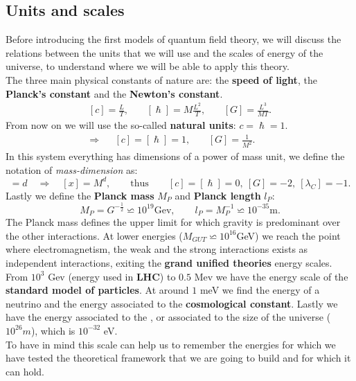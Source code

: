 \subsection{Units and scales}
Before introducing the first models of quantum field theory, we will discuss the relations between the units that we will use and the scales of energy of the universe, to understand where we will be able to apply this theory.\\
The three main physical constants of nature are: the \textbf{speed of light}, the \textbf{Planck's constant} and the \textbf{Newton's constant}.
\begin{align*}
    &&[c]=\frac{L}{T},\ &&[\hslash]=M\frac{L^2}{T},\ &&[G]=\frac{L^3}{MT}.&&
\end{align*} 
From now on we will use the so-called \textbf{natural units}: $c=\hslash=1$.
\begin{align*}
    \Rightarrow&&[c]=[\hslash]=1,\ &&[G]=\frac{1}{M^2}.&&
\end{align*}
In this system everything has dimensions of a power of mass unit, we define the notation of \emph{mass-dimension} as:
\begin{equation*}
    [x]=d \quad\Rightarrow\quad [x]=M^d,\qquad\text{thus}\qquad [c]=[\hslash]=0,\ [G]=-2,\ [\lambda_C]=-1.
\end{equation*}
Lastly we define the \textbf{Planck mass} $M_P$ and \textbf{Planck length} $l_P$:
\begin{equation*}
    M_P=G^{-\frac{1}{2}}\backsimeq 10^{19}\text{Gev},\qquad l_P=M_P^{-1}\backsimeq 10^{-35}\text{m}.
\end{equation*}
The Planck mass defines the upper limit for which gravity is predominant over the other interactions. At lower energies ($M_{GUT}\backsimeq 10^{16}$GeV) we reach the point where electromagnetism, the weak and the strong interactions exists as independent interactions, exiting the \textbf{grand unified theories} energy scales. From $10^3$ Gev (energy used in \textbf{LHC}) to $0.5$ Mev we have the energy scale of the \textbf{standard model of particles}. At around $1$ meV we find the energy of a neutrino and the energy associated to the \textbf{cosmological constant}. Lastly we have the energy associated to the , or associated to the size of the universe ($10^{26}m$), which is $10^{-32}$ eV.\\
To have in mind this scale can help us to remember the energies for which we have tested the theoretical framework that we are going to build and for which it can hold.
